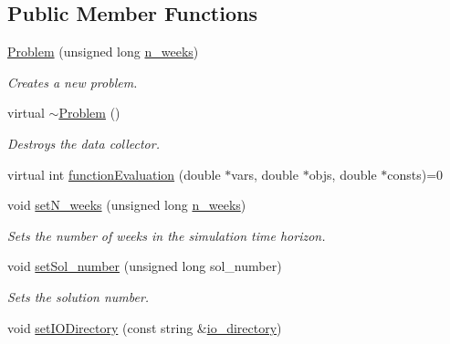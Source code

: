 \subsection*{Public Member Functions}
\begin{DoxyCompactItemize}
\item 
\mbox{\hyperlink{classProblem_afc35e409dbd47f3c457ccac358afbc2e_afc35e409dbd47f3c457ccac358afbc2e}{Problem}} (unsigned long \mbox{\hyperlink{classProblem_ac7513bb0ecdfa4bbb7d2ada3595d71ec_ac7513bb0ecdfa4bbb7d2ada3595d71ec}{n\+\_\+weeks}})
\begin{DoxyCompactList}\small\item\em Creates a new problem. \end{DoxyCompactList}\item 
virtual \mbox{\hyperlink{classProblem_a3f26d4abc0bb8633f315458b8e1b88b9_a3f26d4abc0bb8633f315458b8e1b88b9}{$\sim$\+Problem}} ()
\begin{DoxyCompactList}\small\item\em Destroys the data collector. \end{DoxyCompactList}\item 
virtual int \mbox{\hyperlink{classProblem_acd924a80df4422c5199748c714e9405c_acd924a80df4422c5199748c714e9405c}{function\+Evaluation}} (double $\ast$vars, double $\ast$objs, double $\ast$consts)=0
\item 
void \mbox{\hyperlink{classProblem_a3e8e48d55e03e0f23b303d7b931fa654_a3e8e48d55e03e0f23b303d7b931fa654}{set\+N\+\_\+weeks}} (unsigned long \mbox{\hyperlink{classProblem_ac7513bb0ecdfa4bbb7d2ada3595d71ec_ac7513bb0ecdfa4bbb7d2ada3595d71ec}{n\+\_\+weeks}})
\begin{DoxyCompactList}\small\item\em Sets the number of weeks in the simulation time horizon. \end{DoxyCompactList}\item 
void \mbox{\hyperlink{classProblem_a99967aa4531eac73e5a2928a0df0ea86_a99967aa4531eac73e5a2928a0df0ea86}{set\+Sol\+\_\+number}} (unsigned long sol\+\_\+number)
\begin{DoxyCompactList}\small\item\em Sets the solution number. \end{DoxyCompactList}\item 
void \mbox{\hyperlink{classProblem_a7be506034ce402e135f1caee5d767ca8_a7be506034ce402e135f1caee5d767ca8}{set\+I\+O\+Directory}} (const string \&\mbox{\hyperlink{classProblem_ac58848a0d808cf040c3fb3676b4a236f_ac58848a0d808cf040c3fb3676b4a236f}{io\+\_\+directory}})

\end{DoxyCompactItemize}
